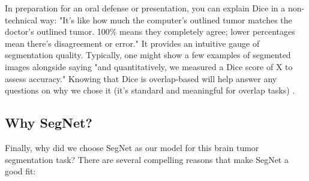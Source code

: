 In preparation for an oral defense or presentation, you can explain Dice in a non-technical way: "It's like how much the computer's outlined tumor matches the doctor's outlined tumor. 100\% means they completely agree; lower percentages mean there's disagreement or error." It provides an intuitive gauge of segmentation quality. Typically, one might show a few examples of segmented images alongside saying "and quantitatively, we measured a Dice score of X to assess accuracy." Knowing that Dice is overlap-based will help answer any questions on why we chose it (it's standard and meaningful for overlap tasks) \cite{oecd2023dice}.

\subsection{Why SegNet?}
\label{sec:why_segnet}

Finally, why did we choose SegNet as our model for this brain tumor segmentation task? There are several compelling reasons that make SegNet a good fit:

